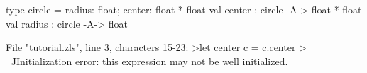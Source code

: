 \runverbatimfalse
{}
\begin{RunVerbatimMsg}
type circle   = {  radius: float;  center: float * float }
val center : circle -A-> float * float
val radius : circle -A-> float
\end{RunVerbatimMsg}
\begin{RunVerbatimErr}
File "tutorial.zls", line 3, characters 15-23:
>let center c = c.center
>               ^^^^^^^^
Initialization error: this expression may not be well initialized.
\end{RunVerbatimErr}
